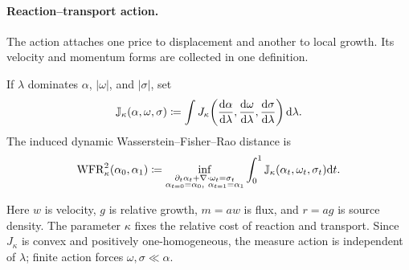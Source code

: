 \paragraph{Reaction--transport action.}
The action attaches one price to displacement and another to local growth. Its velocity and momentum forms are collected in one definition.
\begin{defn}\label{def-dynamic-wfr-distance}
If $\lambda$ dominates $\alpha$, $|\omega|$, and $|\sigma|$, set
\begin{equation}\label{eq-wfr-measure-action}
\mathbb J_\kappa(\alpha,\omega,\sigma)
\coloneqq
\int J_\kappa\!\left(\frac{\mathrm{d}\alpha}{\mathrm{d}\lambda},
\frac{\mathrm{d}\omega}{\mathrm{d}\lambda},\frac{\mathrm{d}\sigma}{\mathrm{d}\lambda}\right)\mathrm{d}\lambda.
\end{equation}
The induced dynamic Wasserstein--Fisher--Rao distance is
\begin{equation}\label{eq-dynamic-unbalanced-ot}
\operatorname{WFR}_\kappa^2(\alpha_0,\alpha_1)
\coloneqq
\inf_{\substack{\partial_t\alpha_t+\nabla\cdot\omega_t=\sigma_t\\
\alpha_{t=0}=\alpha_0,\ \alpha_{t=1}=\alpha_1}}
\int_0^1\mathbb J_\kappa(\alpha_t,\omega_t,\sigma_t)\mathrm{d} t.
\end{equation}
\end{defn}
Here $w$ is velocity, $g$ is relative growth, $m=aw$ is flux, and $r=ag$ is source density. The parameter $\kappa$ fixes the relative cost of reaction and transport. Since \(J_\kappa\) is convex and positively one-homogeneous, the measure action is independent of \(\lambda\); finite action forces \(\omega,\sigma\ll\alpha\).

